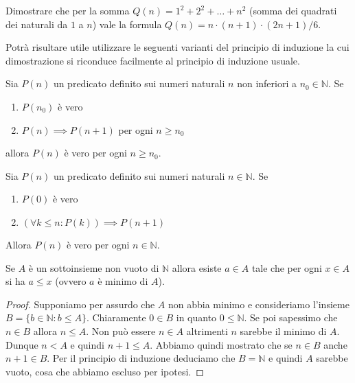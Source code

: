 \documentclass[italian,a4paper,twosides,headinclude]{scrbook}
\newcommand{\NN}{\mathbb N}
\begin{document}
\begin{exercise}
Dimostrare che per la somma
$Q(n) = 1^2 + 2^2 + \dots + n^2$
(somma dei quadrati dei naturali da $1$ a $n$)
vale la formula
$Q(n) = n \cdot (n+1)\cdot (2n + 1) / 6$.
\end{exercise}

Potrà risultare utile utilizzare le seguenti varianti del principio di
induzione la cui dimostrazione si riconduce facilmente al principio di induzione usuale.
\begin{theorem}
Sia $P(n)$ un predicato definito sui numeri naturali $n$
non inferiori a $n_0\in \NN$.
Se
\begin{enumerate}
\item $P(n_0)$ è vero
\item $P(n) \implies P(n+1)$ per ogni $n\ge n_0$
\end{enumerate}
allora $P(n)$ è vero per ogni $n\ge n_0$.
\end{theorem}

\begin{theorem}
Sia $P(n)$ un predicato definito sui numeri naturali $n\in \NN$.
Se
\begin{enumerate}
\item $P(0)$ è vero
\item $(\forall k\le n\colon P(k))\implies P(n+1)$
\end{enumerate}
Allora $P(n)$ è vero per ogni $n\in \NN$.
\end{theorem}

\begin{theorem}[buon ordinamento di $\NN$]
Se $A$ è un sottoinsieme non vuoto di $\NN$ allora esiste $a \in A$
tale che per ogni $x\in A$ si ha $a\le x$ (ovvero $a$ è minimo di $A$).
\end{theorem}
%
\begin{proof}
Supponiamo per assurdo che $A$ non abbia minimo e consideriamo l'insieme
$B=\{b\in \NN\colon b \le A\}$.
Chiaramente $0\in B$ in quanto $0\le \NN$. Se poi sapessimo che $n\in B$
allora $n\le A$. Non può essere $n\in A$ altrimenti $n$ sarebbe il minimo di $A$. Dunque $n < A$ e quindi $n+1 \le A$. Abbiamo quindi mostrato che se $n\in B$ anche $n+1\in B$. Per il principio di induzione deduciamo che $B=\NN$ e quindi $A$ sarebbe vuoto, cosa che abbiamo escluso per ipotesi.
\end{proof}
\end{document}

